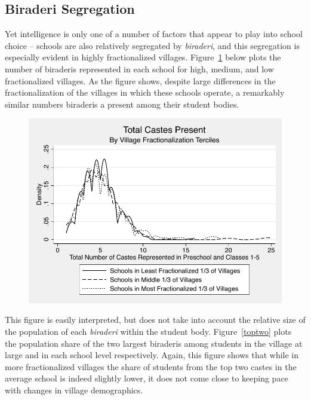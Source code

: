 \documentclass[12pt]{article}
\begin{document}


\subsection{Biraderi Segregation}\label{}

Yet intelligence is only one of a number of factors that appear to play into school choice -- schools are also relatively segregated by \emph{biraderi}, and this segregation is especially evident in highly fractionalized villages. Figure~\ref{numcastes} below plots the number of biraderis represented in each school for high, medium, and low fractionalized villages. As the figure shows, despite large differences in the fractionalization of the villages in which these schools operate, a remarkably similar numbers biraderis a present among their student bodies.

\begin{figure}[H]
	\begin{center}
	\caption{}\label{numcastes}
	\includegraphics[scale=1.0]{graphs/totalpresent.pdf}
	\end{center}
\end{figure}

This figure is easily interpreted, but does not take into account the relative size of the population of each \emph{biraderi} within the student body. Figure~\ref{toptwo} plots the population share of the two largest biraderis among students in the village at large and in each school level respectively. Again, this figure shows that while in more fractionalized villages the share of students from the top two castes in the average school is indeed slightly lower, it does not come close to keeping pace with changes in village demographics.
\end{document}
